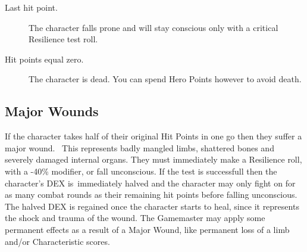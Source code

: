 \begin{description}
	\item[Last hit point.] The character falls prone and will stay conscious only with a critical Resilience test roll.
	\item[Hit points equal zero.] The character is dead. You can spend Hero Points however to avoid death.
\end{description}


\subsection{Major Wounds}
If the character takes half of their original Hit Points in one go then they suffer a major wound.  This represents badly mangled limbs, shattered bones and severely damaged internal organs.
They must immediately make a Resilience roll, with a -40\% modifier, or fall unconscious. If the test is successfull then the character’s DEX is immediately halved and the character may only fight on for as many combat rounds as their remaining hit points before falling unconscious.
The halved DEX is regained once the character starts to heal, since it represents the shock and trauma of the wound.
The Gamemaster may apply some permanent effects as a result of a Major Wound, like permanent loss of a limb and/or Characteristic scores.

